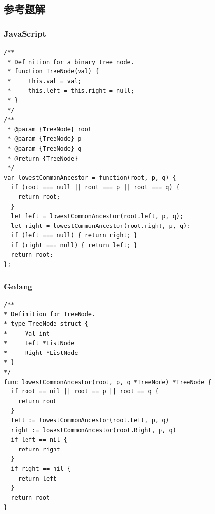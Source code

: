 \subsection{参考题解}

\subsubsection{JavaScript}

\begin{verbatim}
/**
 * Definition for a binary tree node.
 * function TreeNode(val) {
 *     this.val = val;
 *     this.left = this.right = null;
 * }
 */
/**
 * @param {TreeNode} root
 * @param {TreeNode} p
 * @param {TreeNode} q
 * @return {TreeNode}
 */
var lowestCommonAncestor = function(root, p, q) {
  if (root === null || root === p || root === q) {
    return root;
  }
  let left = lowestCommonAncestor(root.left, p, q);
  let right = lowestCommonAncestor(root.right, p, q);
  if (left === null) { return right; }
  if (right === null) { return left; }
  return root;
};
\end{verbatim}

\subsubsection{Golang}

\begin{verbatim}
/**
* Definition for TreeNode.
* type TreeNode struct {
*     Val int
*     Left *ListNode
*     Right *ListNode
* }
*/
func lowestCommonAncestor(root, p, q *TreeNode) *TreeNode {
  if root == nil || root == p || root == q {
    return root
  }
  left := lowestCommonAncestor(root.Left, p, q)
  right := lowestCommonAncestor(root.Right, p, q)
  if left == nil {
    return right
  }
  if right == nil {
    return left
  }
  return root
}
\end{verbatim}

